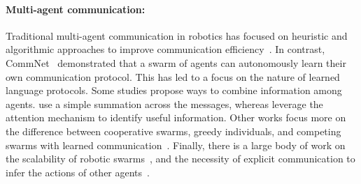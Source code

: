 \paragraph{Multi-agent communication:}
Traditional multi-agent communication in robotics has focused  on heuristic and algorithmic
approaches to improve communication efficiency~\citep{dynamicroute, maretrieval, commefficiency}. In
contrast, CommNet~\citep{commnet}  demonstrated that a swarm of agents can autonomously
learn their own communication protocol. This has led to a focus on the nature of learned language
protocols. Some studies \citep{commnet, coop, attcomm} propose ways to combine information
among agents. \citet{commnet} use a simple summation across the messages, whereas \citet{attcomm}
leverage the attention mechanism to identify useful information. Other works focus more on the
difference between cooperative swarms, greedy individuals, and competing swarms with learned
communication~\citep{emergence, multiagentrl}. Finally, there is  a large body of work on the
scalability of robotic swarms~\citep{graphpolicygrad}, and the necessity of explicit communication
to infer the actions of other agents~\citep{macontrol}.


